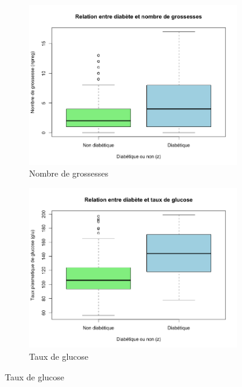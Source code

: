\documentclass[a4paper,10pt]{report}
\begin{document}
\begin{figure}[H]
	\centering
	\captionsetup{justification=centering, margin=2cm}
	\begin{subfigure}[b]{0.25\linewidth}
		\centering
		\captionsetup{justification=centering}
		\includegraphics[width=1\linewidth]{img/1-3-2-boxplot-diabete-grossesses}
		\caption{\scriptsize Nombre de grossesses}
		\label{fig:1-3-2-boxplot-diabete-grossesses}
	\end{subfigure}%
	\begin{subfigure}[b]{0.25\linewidth}
		\centering
		\captionsetup{justification=centering}
		\includegraphics[width=1\linewidth]{img/1-3-2-boxplot-diabete-glucose}
		\caption{\scriptsize Taux de glucose}

\end{subfigure}
\end{figure}
\end{document}
